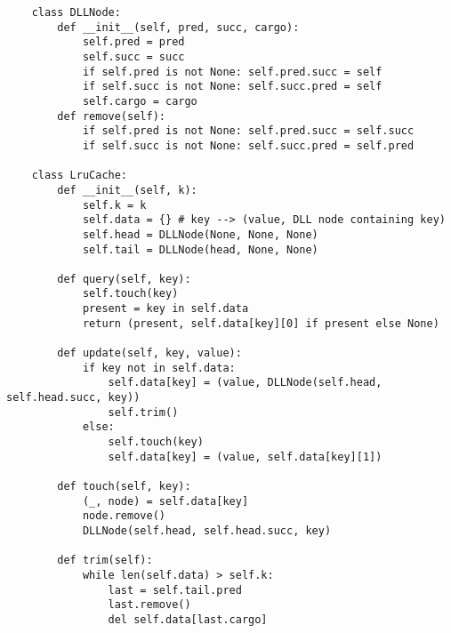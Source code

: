\documentclass{article}
\begin{document}
\begin{verbatim}
    class DLLNode:
        def __init__(self, pred, succ, cargo):  
            self.pred = pred
            self.succ = succ
            if self.pred is not None: self.pred.succ = self
            if self.succ is not None: self.succ.pred = self
            self.cargo = cargo
        def remove(self): 
            if self.pred is not None: self.pred.succ = self.succ
            if self.succ is not None: self.succ.pred = self.pred

    class LruCache:
        def __init__(self, k):
            self.k = k
            self.data = {} # key --> (value, DLL node containing key)
            self.head = DLLNode(None, None, None) 
            self.tail = DLLNode(head, None, None) 

        def query(self, key): 
            self.touch(key)
            present = key in self.data
            return (present, self.data[key][0] if present else None) 

        def update(self, key, value): 
            if key not in self.data:
                self.data[key] = (value, DLLNode(self.head, self.head.succ, key)) 
                self.trim()
            else:
                self.touch(key)
                self.data[key] = (value, self.data[key][1])

        def touch(self, key):
            (_, node) = self.data[key] 
            node.remove()
            DLLNode(self.head, self.head.succ, key)

        def trim(self):
            while len(self.data) > self.k:
                last = self.tail.pred
                last.remove()
                del self.data[last.cargo] 

\end{verbatim}
\end{document}
